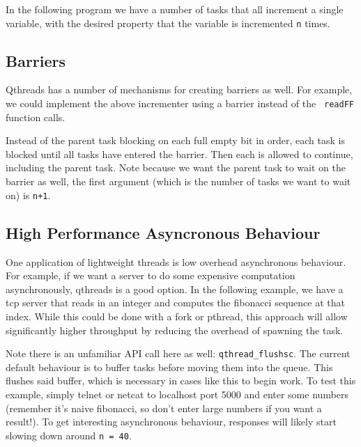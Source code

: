 \documentclass[12pt,fullpage]{article}
\begin{document}
In the following program we have a number of tasks that all increment a single
variable, with the desired property that the variable is incremented {\tt n}
times.
\\




\subsection{Barriers}

Qthreads has a number of mechanisms for creating barriers as well. For example,
we could implement the above incrementer using a barrier instead of the {\tt
readFF} function calls.



Instead of the parent task blocking on each full empty bit in order, each task
is blocked until all tasks have entered the barrier. Then each is allowed to
continue, including the parent task. Note because we want the parent task to
wait on the barrier as well, the first argument (which is the number of tasks we
want to wait on) is {\tt n+1}.

\subsection{High Performance Asyncronous Behaviour}

One application of lightweight threads is low overhead asynchronous behaviour.
For example, if we want a server to do some expensive computation
asynchronously, qthreads is a good option. In the following example, we have a
tcp server that reads in an integer and computes the fibonacci sequence at that
index. While this could be done with a fork or pthread, this approach will allow
significantly higher throughput by reducing the overhead of spawning the task.  



Note there is an unfamiliar API call here as well: {\tt qthread\_flushsc}. The
current default behaviour is to buffer tasks before moving them into the queue.
This flushes said buffer, which is necessary in cases like this to begin work.
To test this example, simply telnet or netcat to localhost port 5000 and
enter some numbers (remember it's naive fibonacci, so don't enter large numbers
if you want a result!). To get interesting asynchronous behaviour, responses will
likely start slowing down around {\tt n = 40}.

\end{document}
